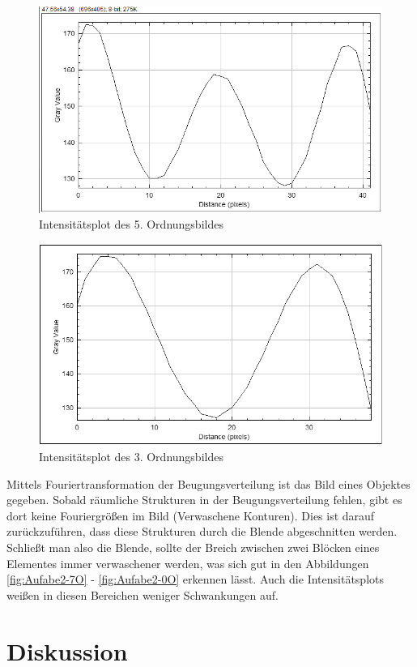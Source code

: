 \documentclass[12pt,a4paper,twoside]{article}
\begin{document}
\begin{figure}[H]
    \centering
    \includegraphics[width=0.6\linewidth]{nudes/A3_O5_Plot.png}
    \caption{Intensitätsplot des 5. Ordnungsbildes}
    \label{fig:IntensitätsPlotO5}
\end{figure}

\begin{figure}[H]
    \centering
    \includegraphics[width=0.6\linewidth]{nudes/A3_O3_Plot.png}
    \caption{Intensitätsplot des 3. Ordnungsbildes}
    \label{fig:IntensitätsPlotO3}
\end{figure}

\noindent
Mittels Fouriertransformation der Beugungsverteilung ist das Bild eines Objektes gegeben. Sobald räumliche Strukturen in der Beugungsverteilung fehlen, gibt es dort keine Fouriergrößen im Bild (Verwaschene Konturen). 
Dies ist darauf zurückzuführen, dass diese Strukturen durch die Blende abgeschnitten werden. 
Schließt man also die Blende, sollte der Breich zwischen zwei Blöcken eines Elementes immer verwaschener werden, was sich gut in den Abbildungen \ref{fig:Aufabe2-7O} - \ref{fig:Aufabe2-0O} erkennen lässt.
Auch die Intensitätsplots weißen in diesen Bereichen weniger Schwankungen auf. \cite{dem2}



\section{Diskussion} %
\end{document}
